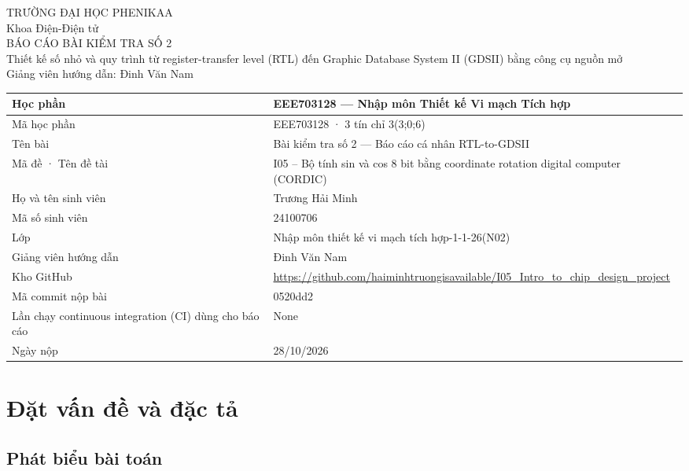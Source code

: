 \documentclass[12pt,a4paper]{article}
\begin{document}
\begin{center}
{\Large TRƯỜNG ĐẠI HỌC PHENIKAA}\\[0.4em]
Khoa Điện-Điện tử\\[1em]
\vspace{1cm}
{\LARGE BÁO CÁO BÀI KIỂM TRA SỐ 2}\\[0.5em]
{\large Thiết kế số nhỏ và quy trình từ register-transfer level (RTL) đến Graphic Database System II (GDSII) bằng công cụ nguồn mở}\\[0.6em]
Giảng viên hướng dẫn: Đinh Văn Nam
\end{center}
\vspace{2cm}
\begin{tabularx}{\textwidth}{|>{\raggedright\arraybackslash}p{4.6cm}|Y|}
\hline
Học phần & EEE703128 — Nhập môn Thiết kế Vi mạch Tích hợp \\ \hline
Mã học phần & EEE703128 · 3 tín chỉ 3(3;0;6) \\ \hline
Tên bài & Bài kiểm tra số 2 — Báo cáo cá nhân RTL-to-GDSII \\ \hline
Mã đề · Tên đề tài & I05 – Bộ tính sin và cos 8 bit bằng coordinate rotation digital computer (CORDIC) \\ \hline
Họ và tên sinh viên & Trương Hải Minh \\ \hline
Mã số sinh viên & 24100706 \\ \hline
Lớp & Nhập môn thiết kế vi mạch tích hợp-1-1-26(N02) \\ \hline
Giảng viên hướng dẫn & Đinh Văn Nam \\ \hline
Kho GitHub & \url{https://github.com/haiminhtruongisavailable/I05_Intro_to_chip_design_project} \\ \hline
Mã commit nộp bài & 0520dd2 \\ \hline
Lần chạy continuous integration (CI) dùng cho báo cáo & None \\ \hline
Ngày nộp & 28/10/2026 \\ \hline
\end{tabularx}
\newpage
\setcounter{tocdepth}{2}
\renewcommand{\contentsname}{Mục lục}
\tableofcontents


\section{Đặt vấn đề và đặc tả}

\subsection{Phát biểu bài toán}
\end{document}
